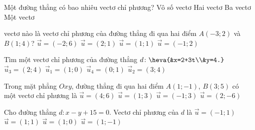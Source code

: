 \begin{ex}%
	Một đường thẳng có bao nhiêu vectơ chỉ phương?
	\choice
	{\True Vô số vectơ}
	{Hai vectơ}
	{Ba vectơ}
	{Một vectơ}
\end{ex}


\begin{ex}%
	vectơ nào là vectơ chỉ phương của đường thẳng đi qua hai điểm $A(-3;2)$ và $B(1;4)$?
	\choice
	{$\overrightarrow{u}=(-2;6)$}
	{\True $\overrightarrow{u}=(2;1)$}
	{$\overrightarrow{u}=(1;1)$}
	{$\overrightarrow{u}=(-1;2)$}
\end{ex}


\begin{ex}%
	Tìm một vectơ chỉ phương của đường thẳng $d \colon \heva{&x=2+3t\\&y=4.}$
	\choice
	{$\overrightarrow{u}_3=(2;4)$}
	{\True $\overrightarrow{u}_1=(1;0)$}
	{$\overrightarrow{u}_4=(0;1)$}
	{$\overrightarrow{u}_2=(3;4)$}
\end{ex}


\begin{ex}%
	Trong mặt phẳng $Oxy$, đường thẳng đi qua hai điểm $A(1;-1)$, $B(3;5)$ có một vectơ chỉ phương là
	\choice
	{$\overrightarrow{u}=(4;6)$}
	{\True $\overrightarrow{u}=(1;3)$}
	{$\overrightarrow{u}=(-1;3)$}
	{$\overrightarrow{u}=(2;-6)$}
\end{ex}


\begin{ex}%
	Cho đường thẳng $d\colon x-y+15=0$. Vectơ chỉ phương của $d$ là
	\choice
	{$\overrightarrow{u}=(-1;1)$}
	{\True $\overrightarrow{u}=(1;1)$}
	{$\overrightarrow{u}=(1;0)$}
	{$\overrightarrow{u}=(1;-1)$}
\end{ex}


